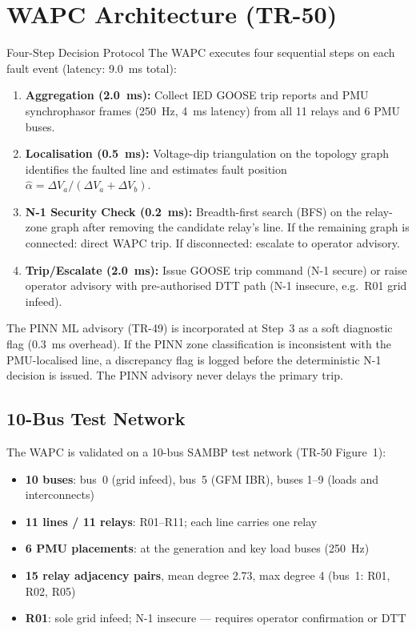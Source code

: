\documentclass[12pt,a4paper]{article}
\begin{document}
\section{WAPC Architecture (TR-50)}

\begin{archbox}{Four-Step Decision Protocol}
The WAPC executes four sequential steps on each fault event (latency: 9.0~ms total):

\begin{enumerate}[nosep]
  \item \textbf{Aggregation (2.0~ms):} Collect IED GOOSE trip reports and PMU synchrophasor frames (250~Hz, 4~ms latency) from all 11 relays and 6 PMU buses.

  \item \textbf{Localisation (0.5~ms):} Voltage-dip triangulation on the topology graph identifies the faulted line and estimates fault position $\hat{\alpha} = \Delta V_a / (\Delta V_a + \Delta V_b)$.

  \item \textbf{N-1 Security Check (0.2~ms):} Breadth-first search (BFS) on the relay-zone graph after removing the candidate relay's line. If the remaining graph is connected: direct WAPC trip. If disconnected: escalate to operator advisory.

  \item \textbf{Trip/Escalate (2.0~ms):} Issue GOOSE trip command (N-1 secure) or raise operator advisory with pre-authorised DTT path (N-1 insecure, e.g.\ R01 grid infeed).
\end{enumerate}

The PINN ML advisory (TR-49) is incorporated at Step~3 as a soft diagnostic flag (0.3~ms overhead). If the PINN zone classification is inconsistent with the PMU-localised line, a discrepancy flag is logged before the deterministic N-1 decision is issued. The PINN advisory never delays the primary trip.
\end{archbox}

\subsection{10-Bus Test Network}

The WAPC is validated on a 10-bus SAMBP test network (TR-50 Figure~1):
\begin{itemize}[nosep]
  \item \textbf{10 buses}: bus~0 (grid infeed), bus~5 (GFM IBR), buses 1--9 (loads and interconnects)
  \item \textbf{11 lines / 11 relays}: R01--R11; each line carries one relay
  \item \textbf{6 PMU placements}: at the generation and key load buses (250~Hz)
  \item \textbf{15 relay adjacency pairs}, mean degree 2.73, max degree 4 (bus~1: R01, R02, R05)
  \item \textbf{R01}: sole grid infeed; N-1 insecure — requires operator confirmation or DTT
\end{itemize}
\end{document}
